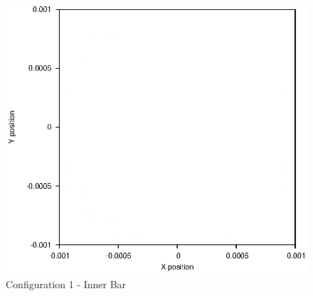 \documentclass[a4paper,12pt]{article}
\begin{document}
\begin{figure}[H]
\centering
\includegraphics[width=.9\textwidth]{./2016results/stablebase/Inner.eps}
\caption{Configuration 1 - Inner Bar}
\label{fig:config1i}
\end{figure}
\end{document}
